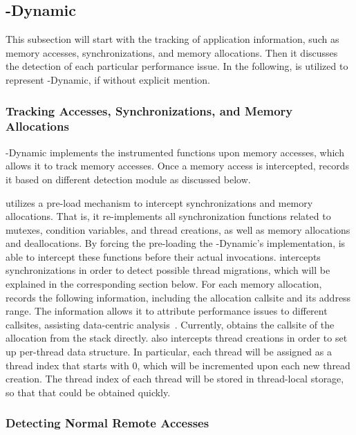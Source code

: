 \subsection{\NP{}-Dynamic}

This subsection will start with the tracking of application information, such as memory accesses, synchronizations, and memory allocations. Then it discusses the detection of each particular performance issue.  In the following, \NP{} is utilized to represent \NP{}-Dynamic, if without explicit mention. 

\subsubsection{Tracking Accesses, Synchronizations, and Memory Allocations}

\NP{}-Dynamic implements the instrumented functions upon memory accesses, which allows it to track memory accesses. Once a memory access is intercepted, \NP{} records it based on different detection module as discussed below. 

\NP{} utilizes a pre-load mechanism to intercept synchronizations and memory allocations. That is, it re-implements all synchronization functions related to  mutexes, condition variables, and thread creations, as well as memory allocations and deallocations. By forcing the pre-loading the \NP{}-Dynamic's implementation, \NP{} is able to intercept these functions before their actual invocations. \NP{} intercepts synchronizations in order to detect possible thread migrations, which will be explained in the corresponding section below. For each memory allocation, \NP{} records the following information, including the allocation callsite and its address range. The information allows it to attribute performance issues to different callsites, assisting data-centric analysis~\cite{XuNuma}. Currently, \NP{} obtains the callsite of the allocation from the stack directly.  \NP{} also intercepts thread creations in order to set up per-thread data structure. In particular, each thread will be assigned as a thread index that starts with 0, which will be incremented upon each new thread creation. The thread index of each thread will be stored in thread-local storage, so that that could be obtained quickly. 

\subsubsection{Detecting Normal Remote Accesses}

